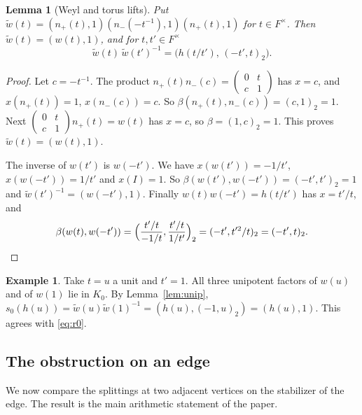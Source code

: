 \documentclass[12pt,letterpaper]{article}
\numberwithin{equation}{section}
\newtheorem{lemma}[theorem]{Lemma}
\theoremstyle{definition}
\newtheorem{example}[theorem]{Example}
\theoremstyle{remark}
\newcommand{\np}{n_{+}}
\newcommand{\nm}{n_{-}}
\newcommand{\sm}[4]{\left(\begin{smallmatrix}#1&#2\\#3&#4\end{smallmatrix}\right)}
\begin{document}
\begin{lemma}[Weyl and torus lifts]\label{lem:weyl}
Put $\widetilde w(t)=(\np(t),1)(\nm(-t^{-1}),1)(\np(t),1)$ for $t\in F^\times$. Then $\widetilde w(t)=(w(t),1)$, and for $t,t'\in F^\times$
\begin{equation}\label{eq:torus}
 \widetilde w(t)\,\widetilde w(t')^{-1}=\bigl(h(t/t'),\,(-t',t)_2\bigr).
\end{equation}
\end{lemma}
\begin{proof}
Let $c=-t^{-1}$. The product $\np(t)\nm(c)=\sm{0}{t}{c}{1}$ has $x=c$, and $x(\np(t))=1$, $x(\nm(c))=c$. So $\beta(\np(t),\nm(c))=(c,1)_2=1$. Next $\sm0tc1\np(t)=w(t)$ has $x=c$, so $\beta=(1,c)_2=1$. This proves $\widetilde w(t)=(w(t),1)$.

The inverse of $w(t')$ is $w(-t')$. We have $x(w(t'))=-1/t'$, $x(w(-t'))=1/t'$ and $x(I)=1$. So $\beta(w(t'),w(-t'))=(-t',t')_2=1$ and $\widetilde w(t')^{-1}=(w(-t'),1)$. Finally $w(t)w(-t')=h(t/t')$ has $x=t'/t$, and
\[
 \beta(w(t),w(-t'))=\Bigl(\frac{t'/t}{-1/t},\frac{t'/t}{1/t'}\Bigr)_2=(-t',t'^2/t)_2=(-t',t)_2 .
\]
\end{proof}

\begin{example}
Take $t=u$ a unit and $t'=1$. All three unipotent factors of $w(u)$ and of $w(1)$ lie in $K_0$. By Lemma~\ref{lem:unip}, $s_0(h(u))=\widetilde w(u)\widetilde w(1)^{-1}=(h(u),(-1,u)_2)=(h(u),1)$. This agrees with \eqref{eq:r0}.
\end{example}

\subsection{The obstruction on an edge}
We now compare the splittings at two adjacent vertices on the stabilizer of the edge. The result is the main arithmetic statement of the paper.
\end{document}
